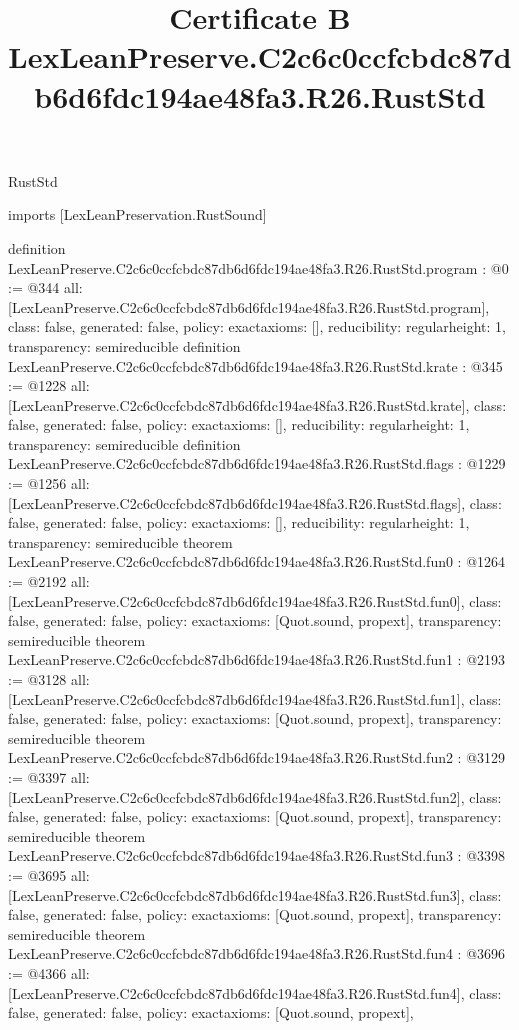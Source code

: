 \begin{lexlean}{RustStd}
\title{Certificate B LexLeanPreserve.C2c6c0ccfcbdc87db6d6fdc194ae48fa3.R26.RustStd}
\begin{coremodule}
imports [LexLeanPreservation.RustSound]

definition LexLeanPreserve.C2c6c0ccfcbdc87db6d6fdc194ae48fa3.R26.RustStd.program : @0 := @344 {
  all: [LexLeanPreserve.C2c6c0ccfcbdc87db6d6fdc194ae48fa3.R26.RustStd.program],
  class: false,
  generated: false,
  policy: exact{axioms: []},
  reducibility: regular{height: 1},
  transparency: semireducible
}
definition LexLeanPreserve.C2c6c0ccfcbdc87db6d6fdc194ae48fa3.R26.RustStd.krate : @345 := @1228 {
  all: [LexLeanPreserve.C2c6c0ccfcbdc87db6d6fdc194ae48fa3.R26.RustStd.krate],
  class: false,
  generated: false,
  policy: exact{axioms: []},
  reducibility: regular{height: 1},
  transparency: semireducible
}
definition LexLeanPreserve.C2c6c0ccfcbdc87db6d6fdc194ae48fa3.R26.RustStd.flags : @1229 := @1256 {
  all: [LexLeanPreserve.C2c6c0ccfcbdc87db6d6fdc194ae48fa3.R26.RustStd.flags],
  class: false,
  generated: false,
  policy: exact{axioms: []},
  reducibility: regular{height: 1},
  transparency: semireducible
}
theorem LexLeanPreserve.C2c6c0ccfcbdc87db6d6fdc194ae48fa3.R26.RustStd.fun0 : @1264 := @2192 {
  all: [LexLeanPreserve.C2c6c0ccfcbdc87db6d6fdc194ae48fa3.R26.RustStd.fun0],
  class: false,
  generated: false,
  policy: exact{axioms: [Quot.sound, propext]},
  transparency: semireducible
}
theorem LexLeanPreserve.C2c6c0ccfcbdc87db6d6fdc194ae48fa3.R26.RustStd.fun1 : @2193 := @3128 {
  all: [LexLeanPreserve.C2c6c0ccfcbdc87db6d6fdc194ae48fa3.R26.RustStd.fun1],
  class: false,
  generated: false,
  policy: exact{axioms: [Quot.sound, propext]},
  transparency: semireducible
}
theorem LexLeanPreserve.C2c6c0ccfcbdc87db6d6fdc194ae48fa3.R26.RustStd.fun2 : @3129 := @3397 {
  all: [LexLeanPreserve.C2c6c0ccfcbdc87db6d6fdc194ae48fa3.R26.RustStd.fun2],
  class: false,
  generated: false,
  policy: exact{axioms: [Quot.sound, propext]},
  transparency: semireducible
}
theorem LexLeanPreserve.C2c6c0ccfcbdc87db6d6fdc194ae48fa3.R26.RustStd.fun3 : @3398 := @3695 {
  all: [LexLeanPreserve.C2c6c0ccfcbdc87db6d6fdc194ae48fa3.R26.RustStd.fun3],
  class: false,
  generated: false,
  policy: exact{axioms: [Quot.sound, propext]},
  transparency: semireducible
}
theorem LexLeanPreserve.C2c6c0ccfcbdc87db6d6fdc194ae48fa3.R26.RustStd.fun4 : @3696 := @4366 {
  all: [LexLeanPreserve.C2c6c0ccfcbdc87db6d6fdc194ae48fa3.R26.RustStd.fun4],
  class: false,
  generated: false,
  policy: exact{axioms: [Quot.sound, propext]},
}
\end{coremodule}
\end{lexlean}
